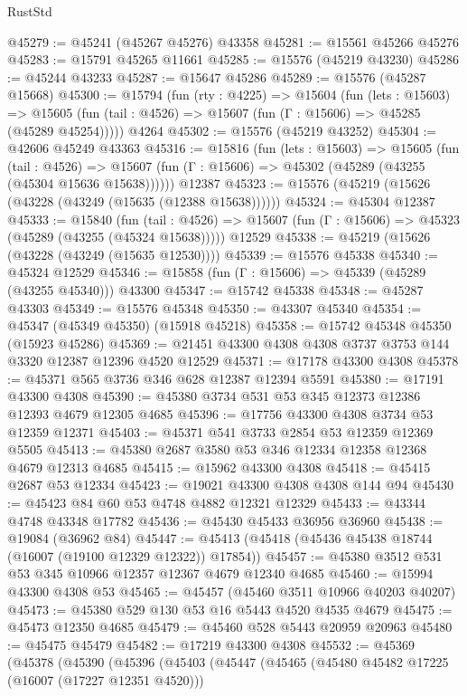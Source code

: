 \begin{lexlean}{RustStd}
\begin{coremodule}
@45279 := @45241 (@45267 @45276) @43358
@45281 := @15561 @45266 @45276
@45283 := @15791 @45265 @11661
@45285 := @15576 (@45219 @43230)
@45286 := @45244 @43233
@45287 := @15647 @45286
@45289 := @15576 (@45287 @15668)
@45300 := @15794
    (fun (rty : @4225) =>
    @15604
      (fun (lets : @15603) =>
      @15605 (fun (tail : @4526) => @15607 (fun (Γ : @15606) => @45285 (@45289 @45254)))))
    @4264
@45302 := @15576 (@45219 @43252)
@45304 := @42606 @45249 @43363
@45316 := @15816
    (fun (lets : @15603) =>
    @15605
      (fun (tail : @4526) =>
      @15607 (fun (Γ : @15606) => @45302 (@45289 (@43255 (@45304 @15636 @15638))))))
    @12387
@45323 := @15576 (@45219 (@15626 (@43228 (@43249 (@15635 (@12388 @15638))))))
@45324 := @45304 @12387
@45333 := @15840
    (fun (tail : @4526) => @15607 (fun (Γ : @15606) => @45323 (@45289 (@43255 (@45324 @15638)))))
    @12529
@45338 := @45219 (@15626 (@43228 (@43249 (@15635 @12530))))
@45339 := @15576 @45338
@45340 := @45324 @12529
@45346 := @15858 (fun (Γ : @15606) => @45339 (@45289 (@43255 @45340))) @43300
@45347 := @15742 @45338
@45348 := @45287 @43303
@45349 := @15576 @45348
@45350 := @43307 @45340
@45354 := @45347 (@45349 @45350) (@15918 @45218)
@45358 := @15742 @45348 @45350 (@15923 @45286)
@45369 := @21451 @43300 @4308 @4308 @3737 @3753 @144 @3320 @12387 @12396 @4520 @12529
@45371 := @17178 @43300 @4308
@45378 := @45371 @565 @3736 @346 @628 @12387 @12394 @5591
@45380 := @17191 @43300 @4308
@45390 := @45380 @3734 @531 @53 @345 @12373 @12386 @12393 @4679 @12305 @4685
@45396 := @17756 @43300 @4308 @3734 @53 @12359 @12371
@45403 := @45371 @541 @3733 @2854 @53 @12359 @12369 @5505
@45413 := @45380 @2687 @3580 @53 @346 @12334 @12358 @12368 @4679 @12313 @4685
@45415 := @15962 @43300 @4308
@45418 := @45415 @2687 @53 @12334
@45423 := @19021 @43300 @4308 @4308 @144 @94
@45430 := @45423 @84 @60 @53 @4748 @4882 @12321 @12329
@45433 := @43344 @4748 @43348 @17782
@45436 := @45430 @45433 @36956 @36960
@45438 := @19084 (@36962 @84)
@45447 := @45413 (@45418 (@45436 @45438 @18744 (@16007 (@19100 @12329 @12322)) @17854))
@45457 := @45380 @3512 @531 @53 @345 @10966 @12357 @12367 @4679 @12340 @4685
@45460 := @15994 @43300 @4308 @53
@45465 := @45457 (@45460 @3511 @10966 @40203 @40207)
@45473 := @45380 @529 @130 @53 @16 @5443 @4520 @4535 @4679
@45475 := @45473 @12350 @4685
@45479 := @45460 @528 @5443 @20959 @20963
@45480 := @45475 @45479
@45482 := @17219 @43300 @4308
@45532 := @45369
    (@45378
      (@45390
        (@45396
          (@45403
            (@45447
              (@45465
                (@45480 @45482 @17225 (@16007 (@17227 @12351 @4520)))

\end{coremodule}
\end{lexlean}
